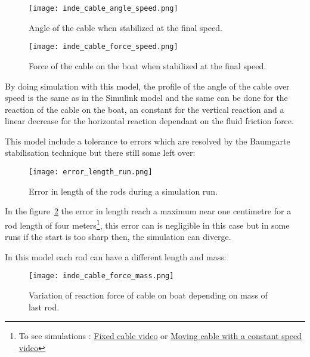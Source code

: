 \begin{figure}[H]
\centering
    \begin{minipage}[b]{0.4\textwidth}
    \centering
    \texttt{[image: inde\_cable\_angle\_speed.png]}
    \caption{Angle of the cable when stabilized at the final speed.}
    \label{fig:angleIndSpeed}
    \end{minipage}
    \hfill
    \begin{minipage}[b]{0.45\textwidth}
    \centering
    \texttt{[image: inde\_cable\_force\_speed.png]}
    \caption{Force of the cable on the boat when stabilized at the final speed.}
    \label{fig:forceIndSpeed}
    \end{minipage}
\end{figure}

By doing simulation with this model, the profile of the angle of the cable over speed is the same as in the Simulink model and the same can be done for the reaction of the cable on the boat, an constant for the vertical reaction and a linear decrease for the horizontal reaction dependant on the fluid friction force.

This model include a tolerance to errors which are resolved by the Baumgarte stabilisation technique but 
there still some left over:


\begin{figure}[H]
\centering
    \texttt{[image: error\_length\_run.png]}
    \caption{Error in length of the rods during a simulation run.}
    \label{fig:errorLRod}
\end{figure}

In the figure~\ref{fig:errorLRod} the error in length reach a maximum near one centimetre for a rod length of four meters\footnote{To see simulations : \href{https://www.youtube.com/watch?v=T7DRGq3E5x8}{Fixed cable video} or \href{https://www.youtube.com/watch?v=V4X0PsgsXZY to see simulations}{Moving cable with a constant speed video}}, this error can is negligible in this case but in some runs if the start is too sharp then, the simulation can diverge.

In this model each rod can have a different length and mass:

\begin{figure}[H]
\centering
    \texttt{[image: inde\_cable\_force\_mass.png]}
    \caption{Variation of reaction force of cable on boat depending on mass of last rod.}
    \label{fig:massForce}
\end{figure}

